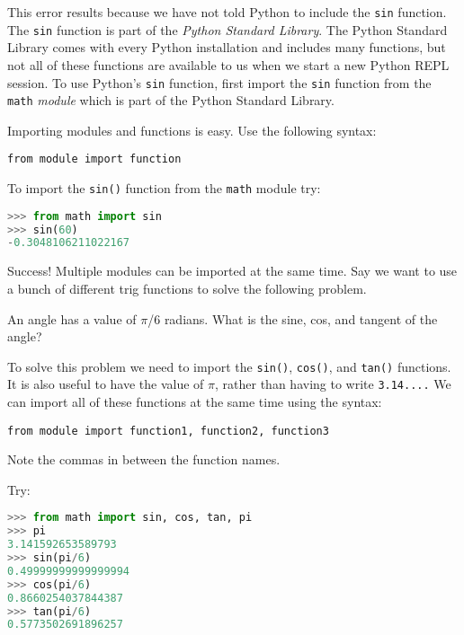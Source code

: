 \documentclass{book}
\newcommand{\passthrough}[1]{#1}
\begin{document}
This error results because we have not told Python to include the
\passthrough{\lstinline!sin!} function. The
\passthrough{\lstinline!sin!} function is part of the \emph{Python
Standard Library}. The Python Standard Library comes with every Python
installation and includes many functions, but not all of these functions
are available to us when we start a new Python REPL session. To use
Python's \passthrough{\lstinline!sin!} function, first import the
\passthrough{\lstinline!sin!} function from the
\passthrough{\lstinline!math!} \emph{module} which is part of the Python
Standard Library.

Importing modules and functions is easy. Use the following syntax:

\begin{lstlisting}
from module import function
\end{lstlisting}

To import the \passthrough{\lstinline!sin()!} function from the
\passthrough{\lstinline!math!} module try:

\begin{lstlisting}[language=Python]
>>> from math import sin
>>> sin(60)
-0.3048106211022167
\end{lstlisting}

Success! Multiple modules can be imported at the same time. Say we want
to use a bunch of different trig functions to solve the following
problem.

An angle has a value of \(\pi\)/6 radians. What is the sine, cos, and
tangent of the angle?

To solve this problem we need to import the
\passthrough{\lstinline!sin()!}, \passthrough{\lstinline!cos()!}, and
\passthrough{\lstinline!tan()!} functions. It is also useful to have the
value of \(\pi\), rather than having to write
\passthrough{\lstinline!3.14....!} We can import all of these functions
at the same time using the syntax:

\begin{lstlisting}
from module import function1, function2, function3
\end{lstlisting}

Note the commas in between the function names.

Try:

\begin{lstlisting}[language=Python]
>>> from math import sin, cos, tan, pi
>>> pi
3.141592653589793
>>> sin(pi/6)
0.49999999999999994
>>> cos(pi/6)
0.8660254037844387
>>> tan(pi/6)
0.5773502691896257
\end{lstlisting}
    
\end{document}
